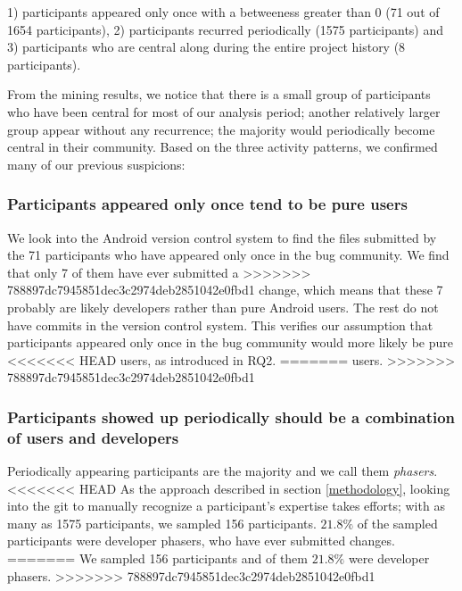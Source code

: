 \documentclass[conference]{IEEEtran}
\begin{document}
1) participants appeared only once with a betweeness greater than 0 (71 out of 1654
participants),
2) participants recurred periodically (1575 participants)
and 3) participants who are central along during the entire project
history (8 participants).


From the mining results, we notice that there is a small group of
participants who have been central for most of our analysis period; another
relatively larger group appear without any recurrence; the majority
would periodically become central in their community. Based on the
three activity patterns, we confirmed many of our previous suspicions:

\subsubsection{Participants appeared only once tend to be pure users}

We look into the Android version control system to find the files
submitted by the 71 participants who have appeared only once in the
bug community. We find that only 7 of them have ever submitted a
>>>>>>> 788897dc7945851dec3c2974deb2851042e0fbd1
change, which means that these 7 probably are likely developers rather
than pure Android users. The rest do not have commits in the version
control system. This verifies our assumption that participants
appeared only once in the bug community would more likely be pure
<<<<<<< HEAD
users, as introduced in RQ2.
=======
users.
>>>>>>> 788897dc7945851dec3c2974deb2851042e0fbd1

\subsubsection{Participants showed up periodically should be a combination of users and developers}

Periodically appearing participants are the majority and we call them
\emph{phasers}. 
<<<<<<< HEAD
As the approach described in section \ref{methodology}, looking into the git to manually recognize a participant's expertise takes efforts; with as many as 1575 participants, we sampled 156 participants. $21.8\%$ of the sampled participants were developer phasers, who have ever submitted changes.
=======
We sampled 156 participants and of them $21.8\%$ were developer phasers.
>>>>>>> 788897dc7945851dec3c2974deb2851042e0fbd1
\end{document}
